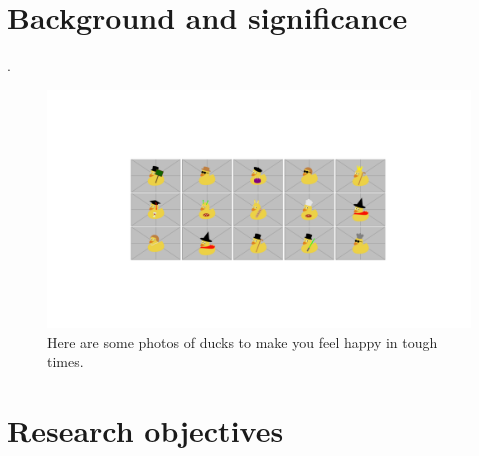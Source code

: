 \clearpage \MainTextSpacing {}


\section{Background and significance}           %

\blindtext \cite{dirac}.

\begin{figure}[ht]
\begin{center}
    \includegraphics[width=\textwidth, trim={6cm 5cm 6cm 5cm},clip,page=1] {figures.pdf}
    \caption{Here are some photos of ducks to make you feel happy in tough times.}
    \label{fig:ducks}
\end{center}
\end{figure}



\section{Research objectives}                   %

\blindtext \cite{knuthwebsite}


